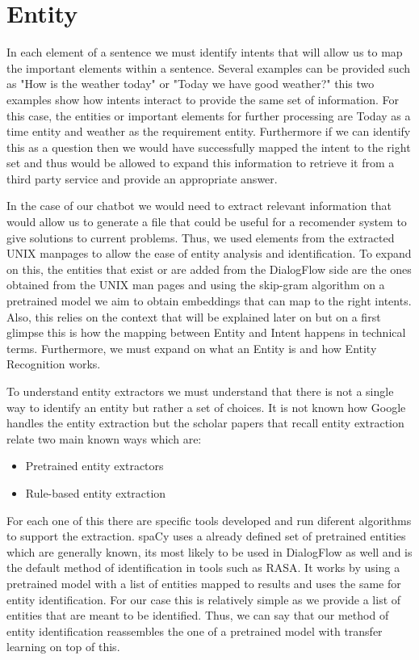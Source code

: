 \section{Entity}

In each element of a sentence we must identify intents that will allow us to map the important elements within a sentence. Several examples can be provided such as "How is the weather today" or "Today we have good weather?" this two examples show how intents interact to provide the same set of information. For this case, the entities or important elements for further processing are Today as a time entity and weather as the requirement entity. Furthermore if we can identify this as a question then we would have successfully mapped the intent to the right set and thus would be allowed to expand this information to retrieve it from a third party service and provide an appropriate answer. 

In the case of our chatbot we would need to extract relevant information that would allow us to generate a file that could be useful for a recomender system to give solutions to current problems. Thus, we used elements from the extracted UNIX manpages to allow the ease of entity analysis and identification. To expand on this, the entities that exist or are added from the DialogFlow side are the ones obtained from the UNIX man pages and using the skip-gram algorithm on a pretrained model we aim to obtain embeddings that can map to the right intents. Also, this relies on the context that will be explained later on but on a first glimpse this is how the mapping between Entity and Intent happens in technical terms. Furthermore, we must expand on what an Entity is and how Entity Recognition works.

To understand entity extractors we must understand that there is not a single way to identify an entity but rather a set of choices. It is not known how Google handles the entity extraction but the scholar papers that recall entity extraction relate two main known ways which are:
\begin{itemize}
    \item Pretrained entity extractors
    \item Rule-based entity extraction
\end{itemize}{}
For each one of this there are specific tools developed and run diferent algorithms to support the extraction. spaCy uses a already defined set of pretrained entities which are generally known, its most likely to be used in DialogFlow as well and is the default method of identification in tools such as RASA. It works by using a pretrained model with a list of entities mapped to results and uses the same for entity identification. For our case this is relatively simple as we provide a list of entities that are meant to be identified. Thus, we can say that our method of entity identification reassembles the one of a pretrained model with transfer learning on top of this.

